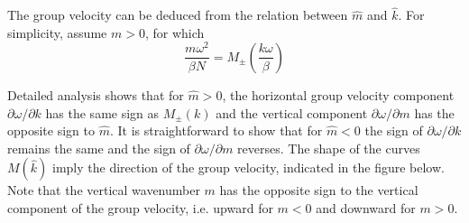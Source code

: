\documentclass{jknotes}
\begin{document}
The group velocity can be deduced from the relation between $\hat{m}$ and
$\hat{k}$. For simplicity, assume $m > 0$, for which
\begin{equation}
	\frac{m\omega^2}{\beta N} = M_{\pm} (\frac{k\omega}{\beta})
\end{equation}

Detailed analysis shows that for $\hat{m} > 0$, the horizontal group velocity
component $\partial \omega/\partial k$ has the same sign as $M_{\pm}(k)$ and
the vertical component $\partial \omega/\partial m$ has the opposite sign to
$\hat{m}$. It is straightforward to show that for $\hat{m} < 0$ the sign of
$\partial \omega/\partial k$ remains the same and the sign of $\partial
\omega/\partial m$ reverses. The shape of the curves $M(\hat{k})$ imply the
direction of the group velocity, indicated in the figure below. Note that the
vertical wavenumber $m$ has the opposite sign to the vertical component of the
group velocity, i.e. upward for $m < 0$ and downward for $m > 0$.
\end{document}
